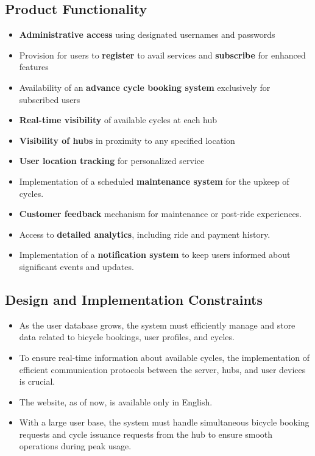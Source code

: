 \documentclass[11pt]{article}
\begin{document}
\subsection{Product Functionality}
\begin{itemize}
    \item \textbf{Administrative access} using designated usernames and passwords
    \item Provision for users to \textbf{register} to avail services and \textbf{subscribe} for enhanced features
    \item Availability of an \textbf{advance cycle booking system} exclusively for subscribed users
    \item \textbf{Real-time visibility} of available cycles at each hub
    \item \textbf{Visibility of hubs} in proximity to any specified location
    \item \textbf{User location tracking} for personalized service
    \item Implementation of a scheduled \textbf{maintenance system} for the upkeep of cycles.
    \item \textbf{Customer feedback} mechanism for maintenance or post-ride experiences.
    \item Access to \textbf{detailed analytics}, including ride and payment history.
    \item Implementation of a \textbf{notification system} to keep users informed about significant events and updates.

\end{itemize}

\subsection{Design and Implementation Constraints}
\begin{itemize}
    \item As the user database grows, the system must efficiently manage and store data related to bicycle bookings, user profiles, and cycles.
    \item To ensure real-time information about available cycles, the implementation of efficient communication protocols between the server, hubs, and user devices is crucial.
    \item The website, as of now, is available only in English.
    \item With a large user base, the system must handle simultaneous bicycle booking requests and cycle issuance requests from the hub to ensure smooth operations during peak usage.

\end{itemize}
\end{document}
